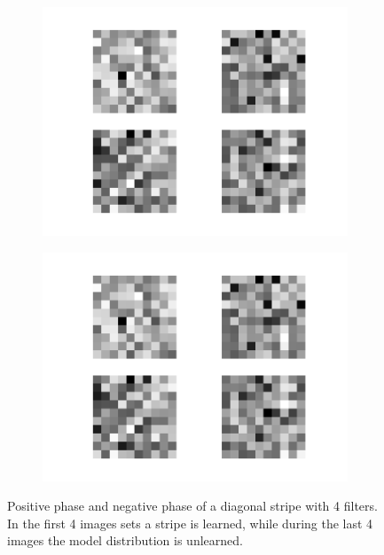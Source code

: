 \begin{figure}[h!]
\begin{subfigure}[t]{.19\textwidth}
  		\includegraphics[width=\linewidth]{imgs/inspect/00017.png}
  		\label{fig:sub1}
	\end{subfigure}%
	\begin{subfigure}[t]{.19\textwidth}
  		\centering
  		\includegraphics[width=\linewidth]{imgs/inspect/00018.png}
  		\label{fig:sub1}
	\end{subfigure}%
	\caption{Positive phase and negative phase of a diagonal stripe with 4 filters. In the first 4 images sets a stripe is learned, while during the last 4 images the model distribution is unlearned.}
	\label{fig:ecdstrlearn}
\end{figure}

